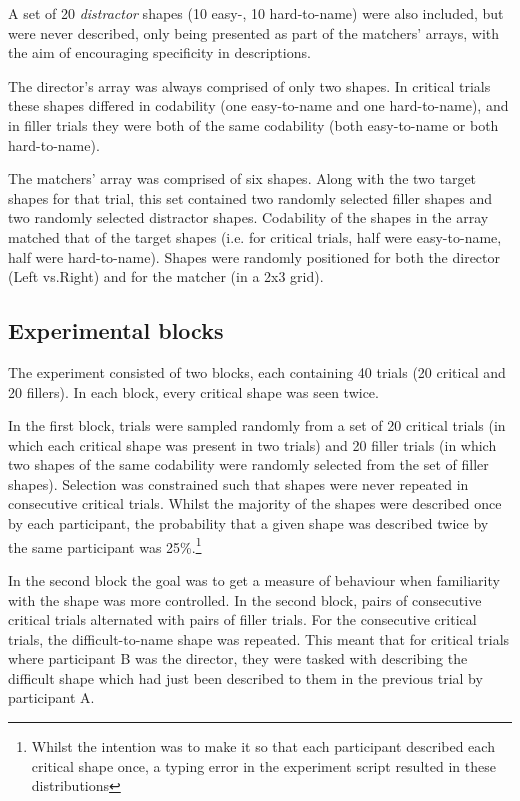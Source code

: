 \documentclass[a4paper,man,natbib]{apa6}
\newcommand*{\term}[1]{\emph{#1}} %
\begin{document}
A set of 20 \term{distractor} shapes (10 easy-, 10 hard-to-name) were also included, but were never described, only being presented as part of the matchers' arrays, with the aim of encouraging specificity in descriptions.

The director's array was always comprised of only two shapes.
In critical trials these shapes differed in codability (one easy-to-name and one hard-to-name), and in filler trials they were both of the same codability (both easy-to-name or both hard-to-name).

The matchers' array was comprised of six shapes.
Along with the two target shapes for that trial, this set contained two randomly selected filler shapes and two randomly selected distractor shapes. 
Codability of the shapes in the array matched that of the target shapes (i.e. for critical trials, half were easy-to-name, half were hard-to-name).
Shapes were randomly positioned for both the director (Left vs.\@ Right) and for the matcher (in a 2x3 grid).


\subsection{Experimental blocks}

The experiment consisted of two blocks, each containing 40 trials (20 critical and 20 fillers). 
In each block, every critical shape was seen twice.

In the first block, trials were sampled randomly from a set of 20 critical trials (in which each critical shape was present in two trials) and 20 filler trials (in which two shapes of the same codability were randomly selected from the set of filler shapes). 
Selection was constrained such that shapes were never repeated in consecutive critical trials.
Whilst the majority of the shapes were described once by each participant, the probability that a given shape was described twice by the same participant was 25\%.\footnote{Whilst the intention was to make it so that each participant described each critical shape once, a typing error in the experiment script resulted in these distributions} 

In the second block the goal was to get a measure of behaviour when familiarity with the shape was more controlled. 
In the second block, pairs of consecutive critical trials alternated with pairs of filler trials. 
For the consecutive critical trials, the difficult-to-name shape was repeated.
This meant that for critical trials where participant B was the director, they were tasked with describing the difficult shape which had just been described to them in the previous trial by participant A.
\end{document}
